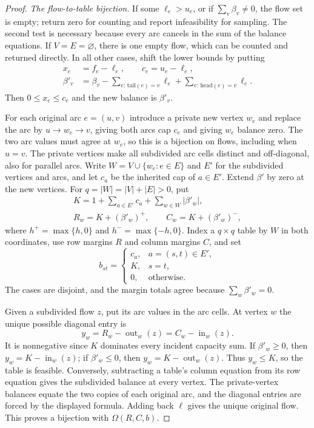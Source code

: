 \begin{proof}
\emph{The flow-to-table bijection.}
If some $\ell_e>u_e$, or if $\sum_v\beta_v\ne0$, the flow set is empty;
return zero for counting and report infeasibility for sampling. The
second test is necessary because every arc cancels in the sum of the
balance equations. If $V=E=\varnothing$, there is one empty flow, which
can be counted and returned directly. In all other cases, shift the
lower bounds by putting
\[
\begin{aligned}
 x_e&=f_e-\ell_e,\qquad c_e=u_e-\ell_e,\\
 \beta'_v&=\beta_v-\sum_{e:\,\mathrm{tail}(e)=v}\ell_e
                    +\sum_{e:\,\mathrm{head}(e)=v}\ell_e.
\end{aligned}
\]
Then $0\le x_e\le c_e$ and the new balance is $\beta'_v$.

For each original arc $e=(u,v)$ introduce a private new vertex $w_e$
and replace the arc by $u\to w_e\to v$, giving both arcs cap $c_e$ and
giving $w_e$ balance zero. The two arc values must agree at $w_e$, so
this is a bijection on flows, including when $u=v$. The private vertices
make all subdivided arc cells distinct and off-diagonal, also for parallel
arcs. Write $W=V\cup\{w_e:e\in E\}$ and $E'$ for the subdivided vertices
and arcs, and let $c_a$ be the inherited cap of $a\in E'$. Extend
$\beta'$ by zero at the new vertices. For $q=|W|=|V|+|E|>0$, put
\[
\begin{gathered}
 K=1+\sum_{a\in E'}c_a+\sum_{w\in W}|\beta'_w|,\\
 R_w=K+(\beta'_w)^+,\qquad C_w=K+(\beta'_w)^-,
\end{gathered}
\]
where $h^+=\max\{h,0\}$ and $h^-=\max\{-h,0\}$. Index a $q\times q$
table by $W$ in both coordinates, use row margins $R$ and column margins
$C$, and set
\[
 b_{st}=\begin{cases}
 c_a,&a=(s,t)\in E',\\
 K,&s=t,\\
 0,&\text{otherwise}.
 \end{cases}
\]
The cases are disjoint, and the margin totals agree because
$\sum_w\beta'_w=0$.

Given a subdivided flow $z$, put its arc values in the arc cells. At
vertex $w$ the unique possible diagonal entry is
\[
 y_w=R_w-\operatorname{out}_w(z)
     =C_w-\operatorname{in}_w(z).
\]
It is nonnegative since $K$ dominates every incident capacity sum.
If $\beta'_w\ge0$, then $y_w=K-\operatorname{in}_w(z)$; if
$\beta'_w\le0$, then $y_w=K-\operatorname{out}_w(z)$. Thus $y_w\le K$,
so the table is feasible. Conversely, subtracting a table's column
equation from its row equation gives the subdivided balance at every
vertex. The private-vertex balances equate the two copies of each
original arc, and the diagonal entries are forced by the displayed
formula. Adding back $\ell$ gives the unique original flow. This proves
a bijection with $\Omega(R,C,b)$.


\end{proof}

